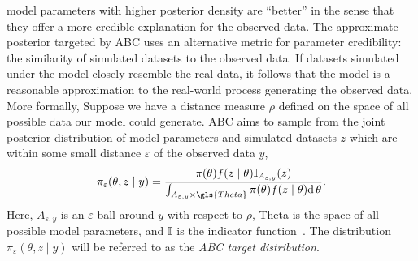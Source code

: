  model parameters with higher posterior density are ``better''
in the sense that they offer a more credible explanation for the observed data.
The approximate posterior targeted by \gls{ABC} uses an alternative metric for
parameter credibility: the similarity of simulated datasets to the observed
data. If datasets simulated under the model closely resemble the real data, it
follows that the model is a reasonable approximation to the real-world process
generating the observed data. More formally,  Suppose we have a distance measure $\rho$
defined on the space of all possible data our model could generate. \gls{ABC}
aims to sample from the joint posterior distribution of model parameters and
simulated datasets $z$ which are within some small distance $\varepsilon$ of
the observed data $y$,
\begin{align}
  \pi_{\varepsilon}(\theta, z \mid y) =
  \frac{\prior(\theta) \lik(z \mid \theta) \I_{A_{\varepsilon, y}} (z)}
  {\int_{A_{\varepsilon, y} \times \gls{Theta}} \prior(\theta) \lik(z \mid \theta) \d \theta}.
  \label{eq:abctarget}
\end{align}
Here, $A_{\varepsilon, y}$ is an $\varepsilon$-ball around $y$ with respect to
$\rho$, \gls{Theta} is the space of all possible model parameters, and $\mathbb{I}$ is
the indicator function~\autocite{marin2012approximate}. The distribution
$\pi_\varepsilon(\theta, z \mid y)$ will be referred to as the
\textit{\gls{ABC} target distribution}. 



